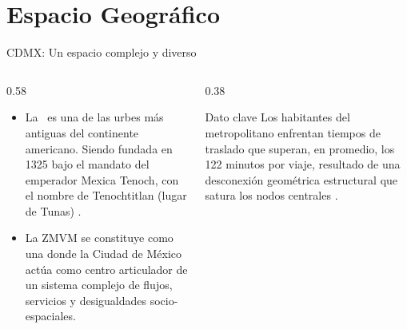 \section{Espacio Geográfico}

\begin{frame}{CDMX: Un espacio complejo y diverso}
  \begin{columns}[T]
    \begin{column}{0.58\textwidth}
      \begin{itemize}
        \item La \zmvm\ es una de las urbes más antiguas del continente americano. Siendo fundada en 1325
        bajo el mandato del emperador Mexica Tenoch, con el nombre de Tenochtitlan (lugar de Tunas) \cite{molina2013erase}.
        \item  La ZMVM se constituye como una  donde la Ciudad de México actúa como centro articulador de 
                un sistema complejo de flujos, servicios y desigualdades socio-espaciales.
      \end{itemize}
    \end{column}
    \begin{column}{0.38\textwidth}
      \begin{block}{Dato clave}
        Los habitantes del  metropolitano enfrentan tiempos de traslado que superan, en promedio, 
        los 122 minutos por viaje, resultado de una desconexión geométrica estructural que satura los nodos centrales \cite{tomtom2023traffic}.
      \end{block}
    \end{column}
  \end{columns}
\end{frame}


